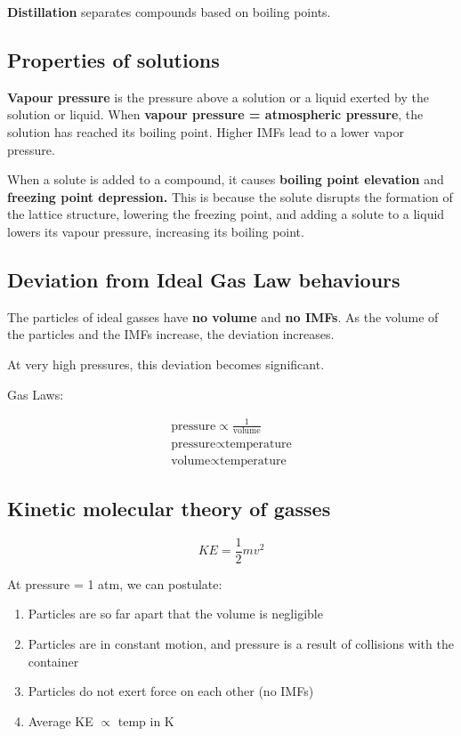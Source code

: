 \documentclass[a4paper, 12pt]{article}
\begin{document}
\textbf{Distillation} separates compounds based on boiling points.

\subsection*{Properties of solutions}

\textbf{Vapour pressure} is the pressure above a solution or a liquid exerted by the solution or liquid. When \textbf{vapour pressure = atmospheric pressure}, the solution has reached its boiling point. Higher IMFs lead to a lower vapor pressure.

When a solute is added to a compound, it causes \textbf{boiling point elevation} and \textbf{freezing point depression.} This is because the solute disrupts the formation of the lattice structure, lowering the freezing point, and adding a solute to a liquid lowers its vapour pressure, increasing its boiling point.

\subsection*{Deviation from Ideal Gas Law behaviours}

The particles of ideal gasses have \textbf{no volume} and \textbf{no IMFs}. As the volume of the particles and the IMFs increase, the deviation increases.

At very high pressures, this deviation becomes significant.

Gas Laws:

\begin{gather*}
\text{pressure} \propto \frac{1}{\text{volume}} \\
\text{pressure} \propto \text{temperature} \\
\text{volume} \propto \text{temperature}
\end{gather*}

\subsection*{Kinetic molecular theory of gasses}

\begin{equation}
\label{eq:ke}
KE = \frac{1}{2} mv^2
\end{equation}

At pressure = 1 atm, we can postulate:

\begin{enumerate}
\item Particles are so far apart that the volume is negligible
\item Particles are in constant motion, and pressure is a result of collisions with the container
\item Particles do not exert force on each other (no IMFs)
\item Average KE $\propto$ temp in K
\end{enumerate}
\end{document}
